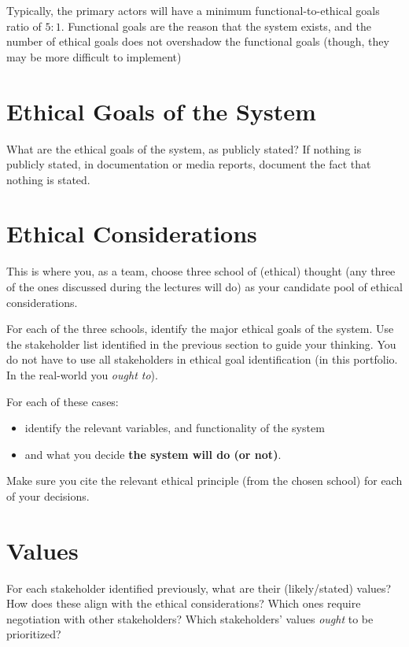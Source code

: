 \documentclass[]
{UCD_CS_41820_Report}
\begin{document}
Typically, the primary actors will have a minimum functional-to-ethical goals ratio of $5:1$. Functional goals are the reason that the system exists, and the number of ethical goals does not overshadow the functional goals (though, they may be more difficult to implement)

\section{Ethical Goals of the System}
What are the ethical goals of the system, as publicly stated? If nothing is publicly stated, in documentation or media reports, document the fact that nothing is stated.

\section{Ethical Considerations}
This is where you, as a team, choose three school of (ethical) thought (any three of the ones discussed during the lectures will do) as your candidate pool of ethical considerations. 

For each of the three schools, identify the major ethical goals of the system. Use the stakeholder list identified in the previous section to guide your thinking. You do not have to use all stakeholders in ethical goal identification (in this portfolio. In the real-world you \textit{ought to}).

For each of these cases:
\begin{itemize}
    \item identify the relevant variables, and functionality of the system
    \item and what you decide \textbf{the system will do (or not)}.
\end{itemize}  

Make sure you cite the relevant ethical principle (from the chosen school) for each of your decisions. 

\section{Values}
For each stakeholder identified previously, what are their (likely/stated) values? How does these align with the ethical considerations? Which ones require negotiation with other stakeholders? Which stakeholders' values \textit{ought} to be prioritized?

\end{document}
